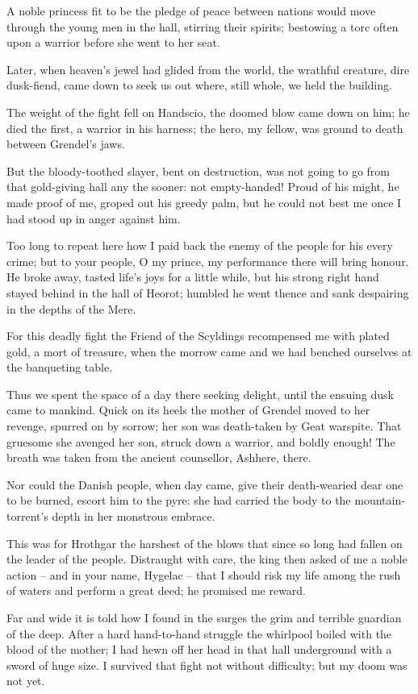 \documentclass[a4paper]{article}
\begin{document}
{\newpage
A noble princess
fit to be the pledge of peace between nations
would move through the young men in the hall,
stirring their spirits; bestowing a torc
often upon a warrior before she went to her seat.

Later, when heaven's jewel
had glided from the world, the wrathful creature,
dire dusk-fiend, came down to seek us out
where, still whole, we held the building.

The weight of the fight fell on Handscio,
the doomed blow came down on him; he died the first,
a warrior in his harness; the hero, my fellow,
was ground to death between Grendel's jaws.

But the bloody-toothed slayer, bent on destruction,
was not going to go from that gold-giving hall
any the sooner: not empty-handed!
Proud of his might, he made proof of me,
groped out his greedy palm, but he could not best me
once I had stood up in anger against him.

Too long to repeat here how I paid back
the enemy of the people for his every crime;
but to your people, O my prince, my performance there
will bring honour. He broke away,
tasted life's joys for a little while,
but his strong right hand stayed behind
in the hall of Heorot; humbled he went thence
and sank despairing in the depths of the Mere.

For this deadly fight the Friend of the Scyldings
recompensed me with plated gold,
a mort of treasure, when the morrow came
and we had benched ourselves at the banqueting table.

Thus we spent the space of a day there
seeking delight, until the ensuing dusk
came to mankind. Quick on its heels
the mother of Grendel moved to her revenge,
spurred on by sorrow; her son was death-taken
by Geat warspite. That gruesome she
avenged her son, struck down a warrior,
and boldly enough! The breath was taken
from the ancient counsellor, Ashhere, there.

\newpage
Nor could the Danish people, when day came,
give their death-wearied dear one to be burned,
escort him to the pyre: she had carried the body
to the mountain-torrent's depth in her monstrous embrace.

This was for Hrothgar the harshest of the blows
that since so long had fallen on the leader of the people.
Distraught with care, the king then asked of me
a noble action – and in your name, Hygelac –
that I should risk my life among the rush of waters
and perform a great deed; he promised me reward.

Far and wide it is told how I found in the surges
the grim and terrible guardian of the deep.
After a hard hand-to-hand struggle
the whirlpool boiled with the blood of the mother;
I had hewn off her head in that hall underground
with a sword of huge size. I survived that fight
not without difficulty; but my doom was not yet.

}
\end{document}
